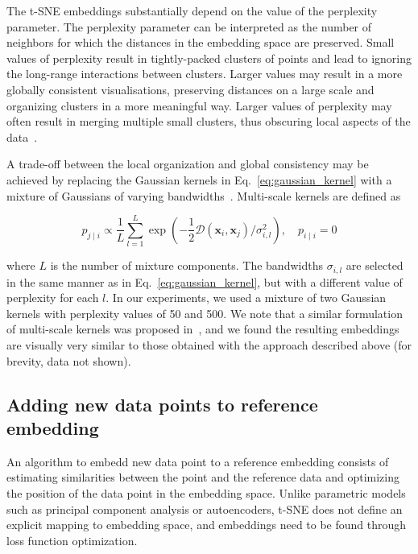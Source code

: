 \documentclass[runningheads]{llncs}
\begin{document}
The t-SNE embeddings substantially depend on the value of the perplexity
parameter. The perplexity parameter can be interpreted as the number of
neighbors for which the distances in the embedding space are preserved. Small
values of perplexity result in tightly-packed clusters of points and lead to
ignoring the long-range interactions between clusters. Larger values may result
in a more globally consistent visualisations, preserving distances on a large
scale and organizing clusters in a more meaningful way. Larger values of
perplexity may often result in merging multiple small clusters, thus obscuring
local aspects of the data~\cite{art_of_using_tsne}.

A trade-off between the local organization and global consistency may be
achieved by replacing the Gaussian kernels in Eq.~\ref{eq:gaussian_kernel} with
a mixture of Gaussians of varying bandwidths~\cite{multiscale_tsne}.
Multi-scale kernels are defined as

\begin{equation}
p_{j \mid i} \propto \frac{1}{L} \sum_{l=1}^{L} \exp \left ( - \frac{1}{2} \mathcal{D}(\mathbf{x}_i, \mathbf{x}_j ) / \sigma_{i,l}^2 \right ), \quad p_{i \mid i} = 0
\label{eq:multiscale}
\end{equation}

\noindent where $L$ is the number of mixture components. The bandwidths
$\sigma_{i,l}$ are selected in the same manner as in
Eq.~\ref{eq:gaussian_kernel}, but with a different value of perplexity for each
$l$. In our experiments, we used a mixture of two Gaussian kernels with
perplexity values of 50 and 500. We note that a similar formulation of
multi-scale kernels was proposed in~\cite{art_of_using_tsne}, and we found the
resulting embeddings are visually very similar to those obtained with the
approach described above (for brevity, data not shown).


\subsection{Adding new data points to reference embedding\label{sec:transfer}}

An algorithm to embedd new data point to a reference embedding consists of
estimating similarities between the point and the reference data and optimizing
the position of the data point in the embedding space. Unlike parametric models
such as principal component analysis or autoencoders, t-SNE does not define an
explicit mapping to embedding space, and embeddings need to be found through
loss function optimization.
\end{document}
